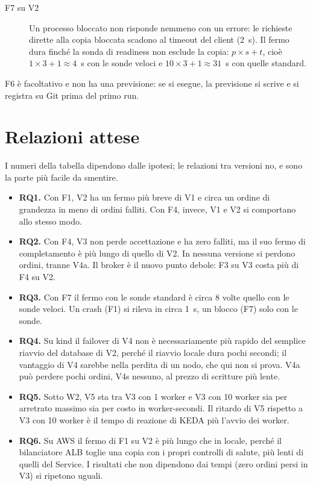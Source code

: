 \begin{description}
  \item[F7 su V2] Un processo bloccato non risponde nemmeno con un errore: le richieste dirette alla copia bloccata scadono al timeout del client (2~s). Il fermo dura finché la sonda di readiness non esclude la copia: $p \times s + t$, cioè $1 \times 3 + 1 \approx 4$~s con le sonde veloci e $10 \times 3 + 1 \approx 31$~s con quelle standard.
\end{description}

F6 è facoltativo e non ha una previsione: se si esegue, la previsione si scrive e si registra su Git prima del primo run.

\section{Relazioni attese}

I numeri della tabella dipendono dalle ipotesi; le relazioni tra versioni no, e sono la parte più facile da smentire.

\begin{itemize}
  \item \textbf{RQ1.} Con F1, V2 ha un fermo più breve di V1 e circa un ordine di grandezza in meno di ordini falliti. Con F4, invece, V1 e V2 si comportano allo stesso modo.
  \item \textbf{RQ2.} Con F4, V3 non perde accettazione e ha zero falliti, ma il suo fermo di completamento è più lungo di quello di V2. In nessuna versione si perdono ordini, tranne V4a. Il broker è il nuovo punto debole: F3 su V3 costa più di F4 su V2.
  \item \textbf{RQ3.} Con F7 il fermo con le sonde standard è circa 8 volte quello con le sonde veloci. Un crash (F1) si rileva in circa 1~s, un blocco (F7) solo con le sonde.
  \item \textbf{RQ4.} Su kind il failover di V4 non è necessariamente più rapido del semplice riavvio del database di V2, perché il riavvio locale dura pochi secondi; il vantaggio di V4 sarebbe nella perdita di un nodo, che qui non si prova. V4a può perdere pochi ordini, V4s nessuno, al prezzo di scritture più lente.
  \item \textbf{RQ5.} Sotto W2, V5 sta tra V3 con 1 worker e V3 con 10 worker sia per arretrato massimo sia per costo in worker-secondi. Il ritardo di V5 rispetto a V3 con 10 worker è il tempo di reazione di KEDA più l'avvio dei worker.
  \item \textbf{RQ6.} Su AWS il fermo di F1 su V2 è più lungo che in locale, perché il bilanciatore ALB toglie una copia con i propri controlli di salute, più lenti di quelli del Service. I risultati che non dipendono dai tempi (zero ordini persi in V3) si ripetono uguali.
\end{itemize}

